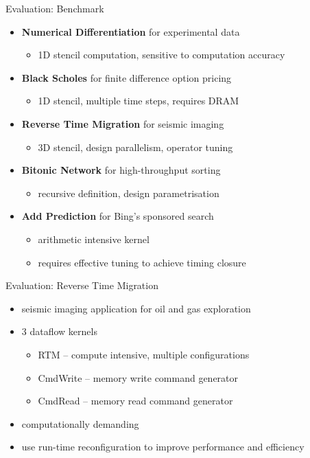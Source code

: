 \begin{frame}{Evaluation: Benchmark}

  \begin{itemize}
  \item \textbf{Numerical Differentiation} for experimental data
    \begin{itemize}
      \item 1D stencil computation, sensitive to computation accuracy
      \end{itemize}
  \item \textbf{Black Scholes} for finite difference option pricing
    \begin{itemize}
      \item 1D stencil, multiple time steps, requires DRAM
    \end{itemize}
  \item \textbf{Reverse Time Migration} for seismic imaging
    \begin{itemize}
      \item 3D stencil, design parallelism, operator tuning
      \end{itemize}
  \item \textbf{Bitonic Network} for high-throughput sorting
    \begin{itemize}
      \item recursive definition, design parametrisation
      \end{itemize}
  \item \textbf{Add Prediction} for Bing's sponsored search
    \begin{itemize}
    \item arithmetic intensive kernel
    \item requires effective tuning to achieve timing closure
  \end{itemize}
  \end{itemize}
\end{frame}

\begin{frame}{Evaluation: Reverse Time Migration}
  \begin{itemize}
  \item seismic imaging application for oil and gas exploration
  \item 3 dataflow kernels
    \begin{itemize}
    \item RTM -- compute intensive, multiple configurations
    \item CmdWrite -- memory write command generator
    \item CmdRead -- memory read command generator
    \end{itemize}
  \item computationally demanding
  \item   use run-time reconfiguration to improve performance and efficiency
  \end{itemize}
\end{frame}

